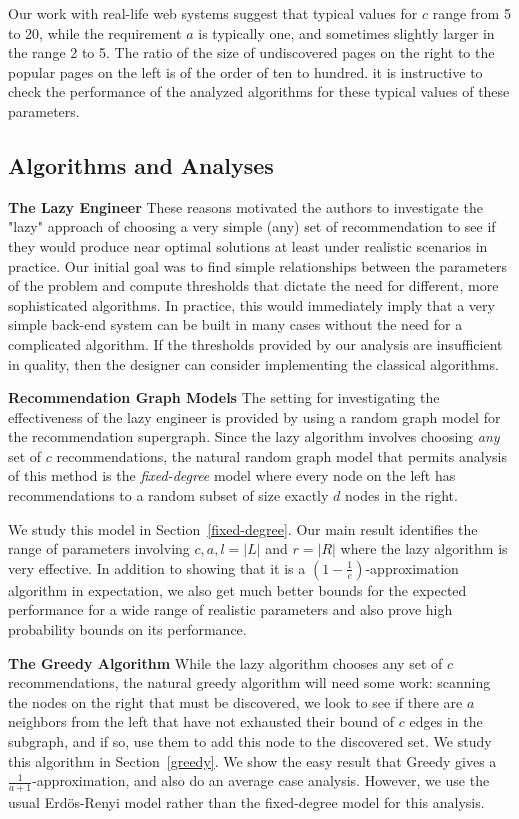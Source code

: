 Our work with real-life web systems suggest that typical values for $c$ range from 5 to 20, while the requirement $a$ is typically one, and sometimes slightly larger in the range 2 to 5. The ratio of the size of undiscovered pages on the right to the popular pages on the left is of the order of ten to hundred. it is instructive to check the performance of the analyzed algorithms for these typical values of these parameters.

\subsection{Algorithms and Analyses}

{\bf The Lazy Engineer}
These reasons motivated the authors to investigate the "lazy" approach of choosing a very simple (any) set of recommendation to see if they would produce near optimal solutions at least under realistic scenarios in practice. Our initial goal was to find simple relationships between the parameters of the problem and compute thresholds that dictate the need for different, more sophisticated algorithms. In practice, this would immediately imply that a very simple back-end system can be built in many cases without the need for a complicated algorithm. If the thresholds provided by our analysis are insufficient in quality, then the designer can consider implementing the classical algorithms.

{\bf Recommendation Graph Models}
The setting for investigating the effectiveness of the lazy engineer is provided by using a random graph model for the recommendation supergraph. Since the lazy algorithm involves choosing {\em any} set of $c$ recommendations, the natural random graph model that permits analysis of this method is the {\em fixed-degree} model where every node on the left has recommendations to a random subset of size exactly $d$ nodes in the right. 

We study this model in Section~\ref{fixed-degree}. Our main result identifies the range of parameters involving $c,a,l=|L|$ and $r =|R|$ where the lazy algorithm is very effective. In addition to showing that it is a $(1-\frac1e)$-approximation algorithm in expectation, we also get much better bounds for the expected performance for a wide range of realistic parameters and also prove high probability bounds on its performance.


{\bf The Greedy Algorithm}
While the lazy algorithm chooses any set of $c$ recommendations, the natural greedy algorithm will need some work: scanning the nodes on the right that must be discovered, we look to see if there are $a$ neighbors from the left that have not exhausted their bound of $c$ edges in the subgraph, and if so, use them to add this node to the discovered set. We study this algorithm in Section~\ref{greedy}. We show the easy result that Greedy gives a $\frac{1}{a+1}$-approximation, and also do an average case analysis. However, we use the usual Erd\"os-Renyi model rather than the fixed-degree model for this analysis.

